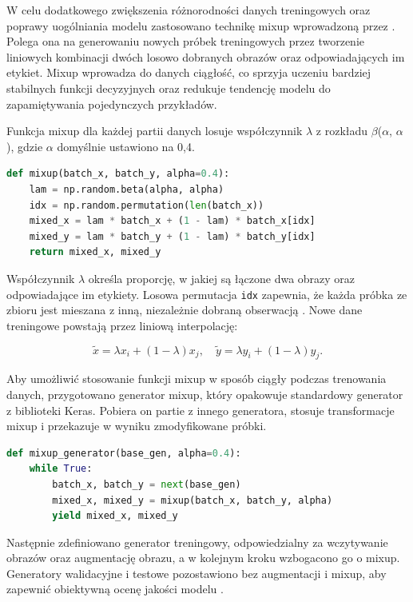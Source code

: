 W celu dodatkowego zwiększenia różnorodności danych treningowych oraz poprawy uogólniania modelu zastosowano technikę mixup wprowadzoną przez \citet{zhang2018mixupempiricalriskminimization}.
Polega ona na generowaniu nowych próbek treningowych przez tworzenie liniowych kombinacji dwóch losowo dobranych obrazów oraz odpowiadających im etykiet.
Mixup wprowadza do danych ciągłość, co sprzyja uczeniu bardziej stabilnych funkcji decyzyjnych oraz redukuje tendencję modelu do zapamiętywania pojedynczych przykładów.

Funkcja mixup dla każdej partii danych losuje współczynnik $\lambda$ z rozkładu $\beta$($\alpha$, $\alpha$), gdzie $\alpha$ domyślnie ustawiono na 0,4.

\begin{lstlisting}[language=Python, caption=Implementacja funkcji mixup]
def mixup(batch_x, batch_y, alpha=0.4):
	lam = np.random.beta(alpha, alpha)
	idx = np.random.permutation(len(batch_x))
	mixed_x = lam * batch_x + (1 - lam) * batch_x[idx]
	mixed_y = lam * batch_y + (1 - lam) * batch_y[idx]
	return mixed_x, mixed_y
\end{lstlisting}

Współczynnik $\lambda$ określa proporcję, w jakiej są łączone dwa obrazy oraz odpowiadające im etykiety.
Losowa permutacja \texttt{idx} zapewnia, że każda próbka ze zbioru jest mieszana z inną, niezależnie dobraną obserwacją \cite{zhang2018mixupempiricalriskminimization}.
Nowe dane treningowe powstają przez liniową interpolację:

\begin{equation}
	\tilde{x} = \lambda x_i + (1 - \lambda) x_j ,\quad \tilde{y} = \lambda y_i + (1 - \lambda) y_j .
\end{equation}

Aby umożliwić stosowanie funkcji mixup w sposób ciągły podczas trenowania danych, przygotowano generator mixup, który opakowuje standardowy generator z biblioteki Keras.
Pobiera on partie z innego generatora, stosuje transformacje mixup i przekazuje w wyniku zmodyfikowane próbki.

\begin{lstlisting}[language=Python, caption=Generator Mixup]
def mixup_generator(base_gen, alpha=0.4):
	while True:
		batch_x, batch_y = next(base_gen)
		mixed_x, mixed_y = mixup(batch_x, batch_y, alpha)
		yield mixed_x, mixed_y
\end{lstlisting}

Następnie zdefiniowano generator treningowy, odpowiedzialny za wczytywanie obrazów oraz augmentację obrazu, a w kolejnym kroku wzbogacono go o mixup.
Generatory walidacyjne i testowe pozostawiono bez augmentacji i mixup, aby zapewnić obiektywną ocenę jakości modelu \cite{thulasidasan2020mixuptrainingimprovedcalibration}.

